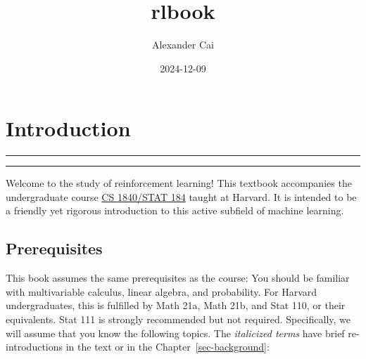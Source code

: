 \documentclass[
  letterpaper,
  DIV=11,
  numbers=noendperiod]{scrreprt}
\title{rlbook}
\author{Alexander Cai}
\date{2024-12-09}
\renewcommand*\contentsname{Table of contents}
\newcommand\contentsname{Table of contents}
\theoremstyle{plain}
\theoremstyle{plain}
\theoremstyle{definition}
\theoremstyle{definition}
\theoremstyle{remark}
\begin{document}
\maketitle

\renewcommand*\contentsname{Table of contents}
{
\hypersetup{linkcolor=}
\setcounter{tocdepth}{2}
\tableofcontents
}


\chapter*{Introduction}\label{introduction}


\begin{center}\rule{0.5\linewidth}{0.5pt}\end{center}

\begin{center}\rule{0.5\linewidth}{0.5pt}\end{center}

\providecommand{\hi}{h}
\providecommand{\hor}{H}
\providecommand{\kl}[2]{\mathrm{KL}\left(#1\parallel#2\right)}
\providecommand{\ind}[1]{\mathbf{1}\left\{#1\right\}}
\providecommand{\st}{s}
\providecommand{\act}{a}
\providecommand{\E}{\mathbb{E}}
\providecommand{\R}{\mathbb{R}}
\providecommand{\pr}{\mathbb{P}}

Welcome to the study of reinforcement learning! This textbook
accompanies the undergraduate course
\href{http://lucasjanson.fas.harvard.edu/courses/CS_Stat_184_0.html}{CS
1840/STAT 184} taught at Harvard. It is intended to be a friendly yet
rigorous introduction to this active subfield of machine learning.

\section*{Prerequisites}\label{prerequisites}


This book assumes the same prerequisites as the course: You should be
familiar with multivariable calculus, linear algebra, and probability.
For Harvard undergraduates, this is fulfilled by Math 21a, Math 21b, and
Stat 110, or their equivalents. Stat 111 is strongly recommended but not
required. Specifically, we will assume that you know the following
topics. The \emph{italicized terms} have brief re-introductions in the
text or in the Chapter~\ref{sec-background}:
\end{document}
